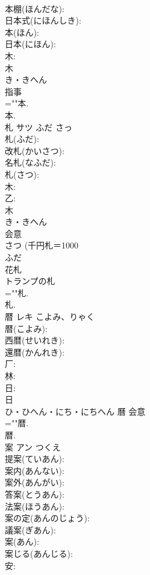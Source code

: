 \documentclass[8pt]{extreport}
\begin{document}
\begin{CJK}{UTF8}{min}
\\	本棚(ほんだな): 
\\	日本式(にほんしき): 
\\	本(ほん): 
\\	日本(にほん): 
\\	木: 
\\	木	
\\	き・きへん	
\\	指事 
\\	=""本.
\\	本.
\\	札	サツ	ふだ	さっ	
\\	札(ふだ): 
\\	改札(かいさつ): 
\\	名札(なふだ): 
\\	札(さつ): 
\\	木: 
\\	乙: 
\\	木	
\\	き・きへん	
\\	会意 
\\	さつ (千円札＝1000 
\\	ふだ 
\\	花札 
\\	トランプの札 
\\	=""札.
\\	札.
\\	暦	レキ	こよみ、りゃく		
\\	暦(こよみ): 
\\	西暦(せいれき): 
\\	還暦(かんれき): 
\\	厂: 
\\	林: 
\\	日: 
\\	日	
\\	ひ・ひへん・にち・にちへん	曆	会意 
\\	=""暦.
\\	暦.
\\	案	アン	つくえ		
\\	提案(ていあん): 
\\	案内(あんない): 
\\	案外(あんがい): 
\\	答案(とうあん): 
\\	法案(ほうあん): 
\\	案の定(あんのじょう): 
\\	議案(ぎあん): 
\\	案(あん): 
\\	案じる(あんじる): 
\\	安: 

\end{CJK}
\end{document}
